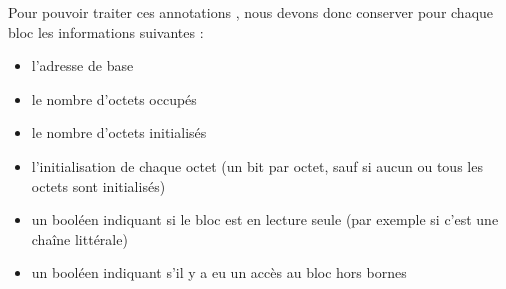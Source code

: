 Pour pouvoir traiter ces annotations \acsl, nous devons donc conserver
pour chaque bloc les informations suivantes :
\begin{itemize}
\item l'adresse de base
\item le nombre d'octets occupés
\item le nombre d'octets initialisés
\item l'initialisation de chaque octet (un bit par octet, sauf si aucun ou tous
  les octets sont initialisés)
\item un booléen indiquant si le bloc est en lecture seule (par exemple si c'est
  une chaîne littérale)
\item un booléen indiquant s'il y a eu un accès au bloc hors bornes
\end{itemize}

